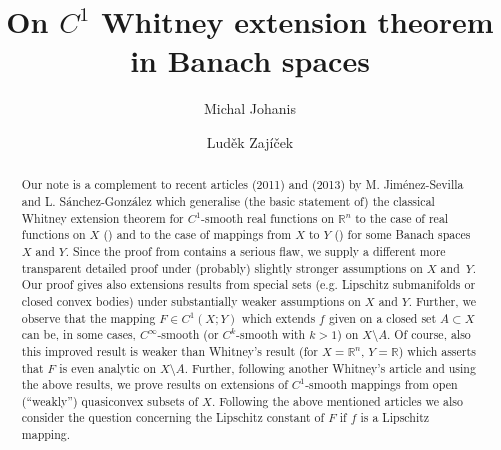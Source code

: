 \documentclass[a4paper,twoside,10pt,reqno,draft]{amsart}
\theoremstyle{definition}
\theoremstyle{remark}
\newcommand\R{{\mathbb R}}
\begin{document}
%
\title{On $C^1$ Whitney extension theorem in Banach spaces}
\author{Michal Johanis}
\address{Charles University, Faculty of Mathematics and Physics\\Department of Mathematical Analysis\\Sokolovská~83\\186~75 Praha~8\\Czech Republic}
\author{Luděk Zajíček}
\address{Charles University, Faculty of Mathematics and Physics\\Department of Mathematical Analysis\\Sokolovská~83\\186~75 Praha~8\\Czech Republic}
\begin{abstract}
Our note is a complement to recent articles \cite{JS1} (2011) and \cite{JS2} (2013) by M. Jiménez-Sevilla and L. Sánchez-González which generalise (the basic statement of) the classical Whitney extension theorem
for $C^1$-smooth real functions on $\R^n$ to the case of real functions on $X$ (\cite{JS1}) and to the case of mappings from $X$ to $Y$ (\cite{JS2}) for some Banach spaces $X$ and $Y$.
Since the proof from \cite{JS2} contains a serious flaw, we supply a different more transparent detailed proof under (probably) slightly stronger assumptions on $X$ and~$Y$.
Our proof gives also extensions results from special sets (e.g. Lipschitz submanifolds or closed convex bodies) under substantially weaker assumptions on $X$ and $Y$.
Further, we observe that the mapping $F\in C^1(X;Y)$ which extends $f$ given on a closed set $A\subset X$ can be, in some cases, $C^\infty$-smooth (or $C^k$-smooth with $k>1$) on $X\setminus A$.
Of course, also this improved result is weaker than Whitney's result (for $X=\R^n$, $Y=\R$) which asserts that $F$ is even analytic on $X\setminus A$.
Further, following another Whitney's article and using the above results, we prove results on extensions of $C^1$-smooth mappings from open (``weakly'') quasiconvex subsets of $X$.
Following the above mentioned articles we also consider the question concerning the Lipschitz constant of $F$ if $f$ is a Lipschitz mapping.
\end{abstract}

\maketitle
\end{document}
